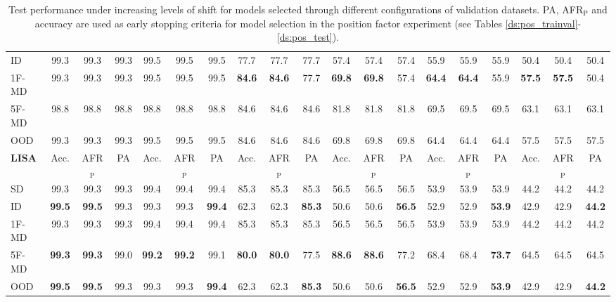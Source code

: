 \begin{table}[H]
{\begin{tabular}{l|ccc|ccc|ccc|ccc|ccc|ccc}
ID & 99.3 & 99.3 & 99.3 & 99.5 & 99.5 & 99.5 & 77.7 & 77.7 & 77.7 & 57.4 & 57.4 & 57.4 & 55.9 & 55.9 & 55.9 & 50.4 & 50.4 & 50.4 \\
1F-MD & 99.3 & 99.3 & 99.3 & 99.5 & 99.5 & 99.5 & {\textbf{84.6}} & \textbf{84.6} & 77.7 & {\textbf{69.8}} & \textbf{69.8} & 57.4 & {\textbf{64.4}} & \textbf{64.4} & 55.9 & {\textbf{57.5}} & \textbf{57.5} & 50.4 \\
5F-MD & 98.8 & 98.8 & 98.8 & 98.8 & 98.8 & 98.8 & 84.6 & 84.6 & 84.6 & 81.8 & 81.8 & 81.8 & 69.5 & 69.5 & 69.5 & 63.1 & 63.1 & 63.1 \\
OOD & 99.3 & 99.3 & 99.3 & 99.5 & 99.5 & 99.5 & 84.6 & 84.6 & 84.6 & 69.8 & 69.8 & 69.8 & 64.4 & 64.4 & 64.4 & 57.5 & 57.5 & 57.5 \\
\midrule
\addlinespace
\addlinespace
\textbf{{\color{tab:green} \textbf{LISA}}} & Acc. & AFR$_\text{P}$ & PA & Acc. & AFR$_\text{P}$ & PA & Acc. & AFR$_\text{P}$ & PA & Acc. & AFR$_\text{P}$ & PA & Acc. & AFR$_\text{P}$ & PA & Acc. & AFR$_\text{P}$ & PA \\
\midrule
SD & 99.3 & 99.3 & 99.3 & 99.4 & 99.4 & 99.4 & 85.3 & 85.3 & 85.3 & 56.5 & 56.5 & 56.5 & 53.9 & 53.9 & 53.9 & 44.2 & 44.2 & 44.2 \\
ID & {\textbf{99.5}} & \textbf{99.5} & 99.3 & 99.3 & 99.3 & {\textbf{99.4}} & 62.3 & 62.3 & {\textbf{85.3}} & 50.6 & 50.6 & {\textbf{56.5}} & 52.9 & 52.9 & {\textbf{53.9}} & 42.9 & 42.9 & {\textbf{44.2}} \\
1F-MD & 99.3 & 99.3 & 99.3 & 99.4 & 99.4 & 99.4 & 85.3 & 85.3 & 85.3 & 56.5 & 56.5 & 56.5 & 53.9 & 53.9 & 53.9 & 44.2 & 44.2 & 44.2 \\
5F-MD & {\textbf{99.3}} & \textbf{99.3} & 99.0 & {\textbf{99.2}} & \textbf{99.2} & 99.1 & {\textbf{80.0}} & \textbf{80.0} & 77.5 & {\textbf{88.6}} & \textbf{88.6} & 77.2 & 68.4 & 68.4 & {\textbf{73.7}} & 64.5 & 64.5 & 64.5 \\
OOD & {\textbf{99.5}} & \textbf{99.5} & 99.3 & 99.3 & 99.3 & {\textbf{99.4}} & 62.3 & 62.3 & {\textbf{85.3}} & 50.6 & 50.6 & {\textbf{56.5}} & 52.9 & 52.9 & {\textbf{53.9}} & 42.9 & 42.9 & {\textbf{44.2}} \\
\bottomrule
\end{tabular}%
}
\caption{Test performance under increasing levels of shift for models selected through different configurations of 
validation datasets. PA, AFR$_{\text{P}}$ and accuracy are used as early stopping criteria for model selection
in the position factor experiment (see Tables \ref{ds:pos_trainval}-\ref{ds:pos_test}).
}
\label{tab:dg_pos_notpaired}
\end{table}

